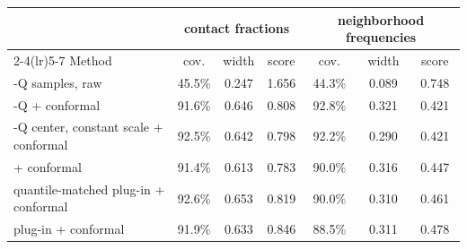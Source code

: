 \begin{tabular}{@{}p{2.45in}cccccc@{}}
\toprule
 & \multicolumn{3}{c}{contact fractions} & \multicolumn{3}{c}{neighborhood frequencies} \\
\cmidrule(lr){2-4}\cmidrule(lr){5-7}
Method & cov. & width & score & cov. & width & score \\
\midrule
\method{}-Q samples, raw & 45.5\% & 0.247 & 1.656 & 44.3\% & 0.089 & 0.748 \\
\method{}-Q + conformal & 91.6\% & 0.646 & 0.808 & 92.8\% & 0.321 & 0.421 \\
\method{}-Q center, constant scale + conformal & 92.5\% & 0.642 & 0.798 & 92.2\% & 0.290 & 0.421 \\
\method{} + conformal & 91.4\% & 0.613 & 0.783 & 90.0\% & 0.316 & 0.447 \\
quantile-matched plug-in + conformal & 92.6\% & 0.653 & 0.819 & 90.0\% & 0.310 & 0.461 \\
plug-in + conformal & 91.9\% & 0.633 & 0.846 & 88.5\% & 0.311 & 0.478 \\
\bottomrule
\end{tabular}
